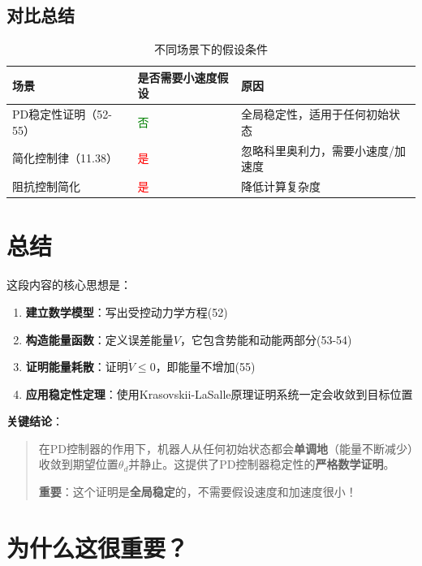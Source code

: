 \documentclass{article}
\begin{document}
\subsection{对比总结}

\begin{table}[h]
\centering
\begin{tabular}{|l|l|l|}
\hline
\textbf{场景} & \textbf{是否需要小速度假设} & \textbf{原因} \\
\hline
PD稳定性证明（52-55） & \textcolor{green}{否} & 全局稳定性，适用于任何初始状态 \\
\hline
简化控制律（11.38） & \textcolor{red}{是} & 忽略科里奥利力，需要小速度/加速度 \\
\hline
阻抗控制简化 & \textcolor{red}{是} & 降低计算复杂度 \\
\hline
\end{tabular}
\caption{不同场景下的假设条件}
\end{table}

\section{总结}

这段内容的核心思想是：

\begin{enumerate}
\item \textbf{建立数学模型}：写出受控动力学方程(52)

\item \textbf{构造能量函数}：定义误差能量$V$，它包含势能和动能两部分(53-54)

\item \textbf{证明能量耗散}：证明$\dot{V} \leq 0$，即能量不增加(55)

\item \textbf{应用稳定性定理}：使用Krasovskii-LaSalle原理证明系统一定会收敛到目标位置
\end{enumerate}

\textbf{关键结论}：

\begin{quote}
在PD控制器的作用下，机器人从任何初始状态都会\textbf{单调地}（能量不断减少）收敛到期望位置$\theta_d$并静止。这提供了PD控制器稳定性的\textbf{严格数学证明}。

\textbf{重要}：这个证明是\textbf{全局稳定}的，不需要假设速度和加速度很小！
\end{quote}

\section{为什么这很重要？}
\end{document}
